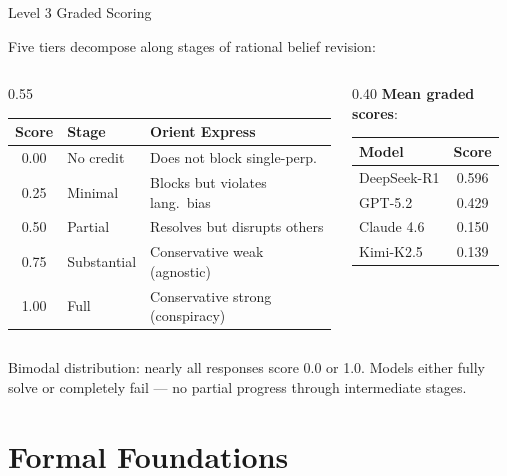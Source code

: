 \documentclass[aspectratio=169]{beamer}
\begin{document}
\begin{frame}{Level 3 Graded Scoring}

\footnotesize
Five tiers decompose along stages of rational belief revision:

\vspace{0.3em}
\begin{columns}[T]
\begin{column}{0.55\textwidth}
\begin{tabular}{@{}clp{4.2cm}@{}}
\toprule
\textbf{Score} & \textbf{Stage} & \textbf{Orient Express} \\
\midrule
0.00 & No credit & Does not block single-perp. \\
0.25 & Minimal & Blocks but violates lang.\ bias \\
0.50 & Partial & Resolves but disrupts others \\
0.75 & Substantial & Conservative weak (agnostic) \\
1.00 & Full & Conservative strong (conspiracy) \\
\bottomrule
\end{tabular}
\end{column}
\begin{column}{0.40\textwidth}
\textbf{Mean graded scores}:\\[4pt]
\begin{tabular}{@{}lc@{}}
\toprule
Model & Score \\
\midrule
DeepSeek-R1 & 0.596 \\
GPT-5.2     & 0.429 \\
Claude 4.6  & 0.150 \\
Kimi-K2.5   & 0.139 \\
\bottomrule
\end{tabular}
\end{column}
\end{columns}

\vspace{0.5em}
\small
Bimodal distribution: nearly all responses score 0.0 or 1.0. Models either fully solve or completely fail --- no partial progress through intermediate stages.
\end{frame}


\section{Formal Foundations}
\end{document}
